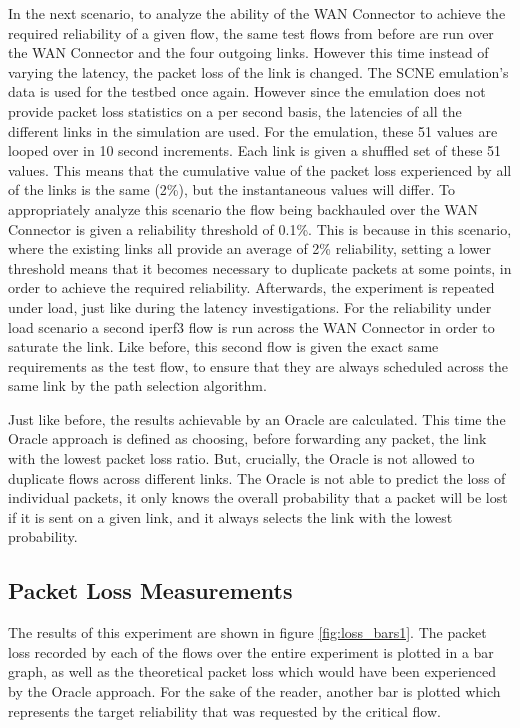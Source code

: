 In the next scenario, to analyze the ability of the WAN Connector to achieve the required reliability of a given flow, the same test flows from before are run over the WAN Connector and the four outgoing links. However this time instead of varying the latency, the packet loss of the link is changed. The SCNE emulation's data is used for the testbed once again. However since the emulation does not provide packet loss statistics on a per second basis, the latencies of all the different links in the simulation are used. For the emulation, these 51 values are looped over in 10 second increments. Each link is given a shuffled set of these 51 values. This means that the cumulative value of the packet loss experienced by all of the links is the same (2\%), but the instantaneous values will differ. To appropriately analyze this scenario the flow being backhauled over the WAN Connector is given a reliability threshold of 0.1\%. This is because in this scenario, where the existing links all provide an average of 2\% reliability, setting a lower threshold means that it becomes necessary to duplicate packets at some points, in order to achieve the required reliability. Afterwards, the experiment is repeated under load, just like during the latency investigations. For the reliability under load scenario a second iperf3 flow is run across the WAN Connector in order to saturate the link. Like before, this second flow is given the exact same requirements as the test flow, to ensure that they are always scheduled across the same link by the path selection algorithm.

Just like before, the results achievable by an Oracle are calculated.  This time the Oracle approach is defined as choosing, before forwarding any packet, the link with the lowest packet loss ratio. But, crucially, the Oracle is not allowed to duplicate flows across different links. The Oracle is not able to predict the loss of individual packets, it only knows the overall probability that a packet will be lost if it is sent on a given link, and it always selects the link with the lowest probability.

\subsection{Packet Loss Measurements}

 The results of this experiment are shown in figure \ref{fig:loss_bars1}. The packet loss recorded by each of the flows over the entire experiment is plotted in a bar graph, as well as the theoretical packet loss which would have been experienced by the Oracle approach. For the sake of the reader, another bar is plotted which represents the target reliability that was requested by the critical flow.

